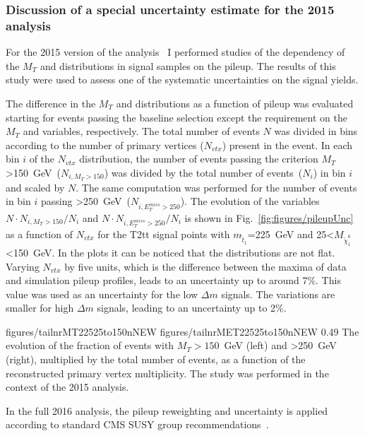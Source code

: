 \subsubsection{Discussion of a special uncertainty estimate for the 2015 analysis}

For the 2015 version of the analysis~\cite{Sirunyan:2016jpr} I performed studies of the dependency of the $M_{T}$ and \MET distributions in signal samples on the pileup. The results of this study were used to assess one of the systematic uncertainties on the signal yields. 


The difference in the $M_{T}$ and \MET distributions as a function of pileup was evaluated starting for events passing the baseline selection except the requirement on the $M_{T}$ and \MET variables, respectively. The total number of events $N$ was divided in bins according to  the number of primary vertices  ($N_{vtx}$) present in the event. In each  bin $i$ of the $N_{vtx}$ distribution, the number of events passing the criterion $M_{T}$>150~GeV~($N_{i,M_{T}>150}$) was divided by the total number of events~($N_{i}$) in bin $i$ and scaled by $N$. The same computation was performed for the number of events in bin $i$ passing \MET>250~GeV~($N_{i,E_{T}^{miss}>250}$). The evolution of the variables $N \cdot N_{i,M_{T}>150}/N_{i}$ and $N \cdot N_{i,E_{T}^{miss}>250}/N_{i}$ is shown in  Fig.~\ref{fig:figures/pileupUnc} as a function of $N_{vtx}$ for the T2tt signal points with $m_{\tilde{t}_{1}}$=225~GeV and 25<$M_{\tilde{\chi}_{1}^{0}}$<150~GeV. In the plots it can be noticed that  the distributions are not flat. Varying $N_{vtx}$ by five units, which is the difference between the maxima of data and simulation pileup profiles, leads to an uncertainty up to around 7\%. This value was used as an uncertainty for the low $\Delta m$ signals. The variations are smaller for high $\Delta m$ signals, leading to an uncertainty up to 2\%.

                 {figures/tailnrMT22525to150nNEW} %
                 {figures/tailnrMET22525to150nNEW} %
                 {0.49}       %
                 { The evolution  of the fraction of events with $M_{T}>150$~GeV (left) and \MET>250~GeV (right), multiplied by the total number of events, as a function of the reconstructed primary vertex multiplicity. The study was performed in the context of the 2015 analysis. }


 In the full 2016 analysis, the pileup reweighting and uncertainty is applied according to standard CMS SUSY group recommendations~\cite{website:SUSYrec}.

